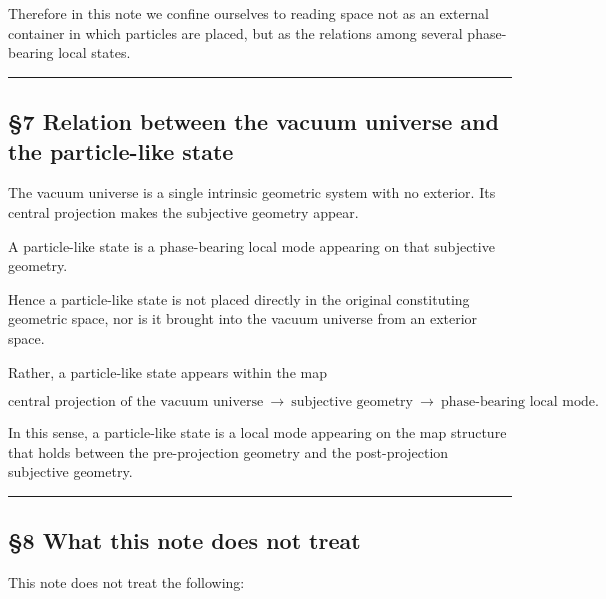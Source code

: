 \documentclass[
]{article}
\begin{document}
Therefore in this note we confine ourselves to reading space not as an
external container in which particles are placed, but as the relations
among several phase-bearing local states.

\begin{center}\rule{0.5\linewidth}{0.5pt}\end{center}

\subsection{§7 Relation between the vacuum universe and the
particle-like
state}\label{relation-between-the-vacuum-universe-and-the-particle-like-state}

The vacuum universe is a single intrinsic geometric system with no
exterior. Its central projection makes the subjective geometry appear.

A particle-like state is a phase-bearing local mode appearing on that
subjective geometry.

Hence a particle-like state is not placed directly in the original
constituting geometric space, nor is it brought into the vacuum universe
from an exterior space.

Rather, a particle-like state appears within the map

\[\text{central projection of the vacuum universe}\ \rightarrow\ \text{subjective geometry}\ \rightarrow\ \text{phase-bearing local mode}.\]

In this sense, a particle-like state is a local mode appearing on the
map structure that holds between the pre-projection geometry and the
post-projection subjective geometry.

\begin{center}\rule{0.5\linewidth}{0.5pt}\end{center}

\subsection{§8 What this note does not
treat}\label{what-this-note-does-not-treat}

This note does not treat the following:
\end{document}
